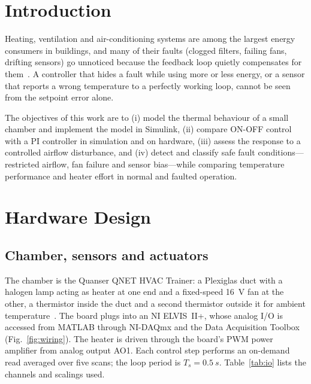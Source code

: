 \documentclass[conference,a4paper]{IEEEtran}
\begin{document}
\section{Introduction}
Heating, ventilation and air-conditioning systems are among the largest energy consumers in
buildings, and many of their faults (clogged filters, failing fans, drifting sensors) go unnoticed
because the feedback loop quietly compensates for them~\cite{isermann2005}. A controller that hides a
fault while using more or less energy, or a sensor that reports a wrong temperature to a perfectly
working loop, cannot be seen from the setpoint error alone.

The objectives of this work are to (i) model the thermal behaviour of a small chamber and implement
the model in Simulink, (ii) compare ON-OFF control with a PI controller in simulation and on
hardware, (iii) assess the response to a controlled airflow disturbance, and (iv) detect and
classify safe fault conditions---restricted airflow, fan failure and sensor bias---while comparing
temperature performance and heater effort in normal and faulted operation.

\section{Hardware Design}\label{sec:setup}
\subsection{Chamber, sensors and actuators}
The chamber is the Quanser QNET HVAC Trainer: a Plexiglas duct with a halogen lamp acting as heater
at one end and a fixed-speed \SI{16}{V} fan at the other, a thermistor inside the duct and a second
thermistor outside it for ambient temperature~\cite{quanser}. The board plugs into an NI ELVIS~II+,
whose analog I/O is accessed from MATLAB through NI-DAQmx and the Data Acquisition Toolbox
(Fig.~\ref{fig:wiring}). The heater is driven through the board's PWM power amplifier from analog
output AO1. Each control step performs an on-demand read averaged over five scans; the loop period
is $T_s=\SI{0.5}{s}$. Table~\ref{tab:io} lists the channels and scalings used.
\end{document}
